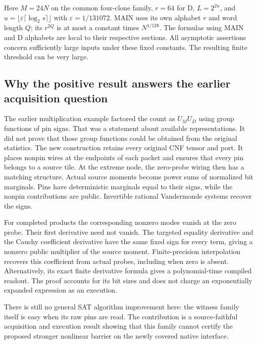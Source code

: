 \documentclass[
  11pt,
]{article}
\begin{document}
Here \(M=24N\) on the common four-clone family, \(r=64\) for D,
\(L=2^{2u}\), and \(u=\lfloor\varepsilon\lceil\log_2s\rceil\rfloor\)
with \(\varepsilon=1/131072\). MAIN uses its own alphabet \(r\) and word
length \(Q\); its \(r^{2Q}\) is at most a constant times \(N^{1/128}\).
The formulas using MAIN and D alphabets are local to their respective
sections. All asymptotic assertions concern sufficiently large inputs
under these fixed constants. The resulting finite threshold can be very
large.

\subsection{Why the positive result answers the earlier acquisition
question}\label{v9-why-the-positive-result-answers-the-earlier-acquisition-question}

The earlier multiplication example factored the count as \(U_MU_D\)
using group functions of pin signs. That was a statement about available
representations. It did not prove that those group functions could be
obtained from the original statistics. The new construction retains
every original CNF tensor and port. It places nonpin wires at the
endpoints of each packet and ensures that every pin belongs to a source
tile. At the extreme node, the zero-probe wiring then has a matching
structure. Actual source moments become power sums of normalized bit
marginals. Pins have deterministic marginals equal to their signs, while
the nonpin contributions are public. Invertible rational Vandermonde
systems recover the signs.

For completed products the corresponding nonzero modes vanish at the
zero probe. Their first derivative need not vanish. The targeted
equality derivative and the Cauchy coefficient derivative have the same
fixed sign for every term, giving a nonzero public multiplier of the
source moment. Finite-precision interpolation recovers this coefficient
from actual probes, including when zero is absent. Alternatively, its
exact finite derivative formula gives a polynomial-time compiled
readout. The proof accounts for its bit sizes and does not charge an
exponentially expanded expression as an execution.

There is still no general SAT algorithm improvement here: the witness
family itself is easy when its raw pins are read. The contribution is a
source-faithful acquisition and execution result showing that this
family cannot certify the proposed stronger nonlinear barrier on the
newly covered native interface.
\end{document}
